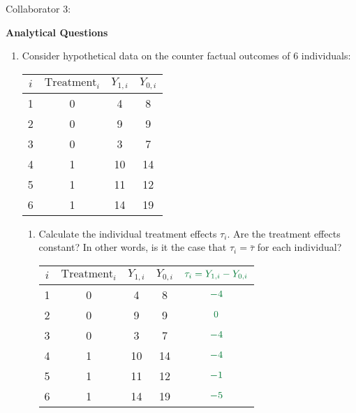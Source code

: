 \documentclass[11pt]{article}
\begin{document}
\begin{onehalfspacing}
\vspace{0.1in}

Collaborator 3: 			


\newpage


\begin{center}
\textbf{Analytical Questions} \bigskip
\end{center}


\begin{enumerate}
	
\item Consider hypothetical data on the counter factual outcomes of 6 individuals:

\begin{table}[htb]
	\centering
	\begin{tabular}{c c c c}
		\toprule
		$i$ & $\text{Treatment}_i$ & $Y_{1,i}$ & $Y_{0,i}$  \\ \toprule
		1 & 0 & 4 & 8 \\
		2 & 0 & 9 & 9 \\
		3 & 0 & 3 & 7 \\
		4 & 1 & 10 & 14 \\
		5 & 1 & 11 & 12 \\
		6 & 1 & 14 & 19 \\
		\bottomrule
	\end{tabular}
\end{table}

\begin{enumerate}
	\item Calculate the individual treatment effects $\tau_i$. Are the treatment effects constant? In other words, is it the case that $\tau_i = \bar{\tau}$ for each individual?
	\begin{table}[htb]
		\centering
		\begin{tabular}{c c c c c}
			\toprule
			$i$ & $\text{Treatment}_i$ & $Y_{1,i}$ & $Y_{0,i}$ & $\color{pine_green}{\tau_i = Y_{1,i} - Y_{0,i}}$  \\ \toprule
			1 & 0 & 4 & 8 & $\color{pine_green}{-4}$ \\
			2 & 0 & 9 & 9 & $\color{pine_green}{0}$ \\
			3 & 0 & 3 & 7 & $\color{pine_green}{-4}$ \\
			4 & 1 & 10 & 14 & $\color{pine_green}{-4}$ \\
			5 & 1 & 11 & 12 & $\color{pine_green}{-1}$ \\
			6 & 1 & 14 & 19 & $\color{pine_green}{-5}$ \\
			\bottomrule
		\end{tabular}
	\end{table}


\end{enumerate}
\end{enumerate}
\end{onehalfspacing}
\end{document}
